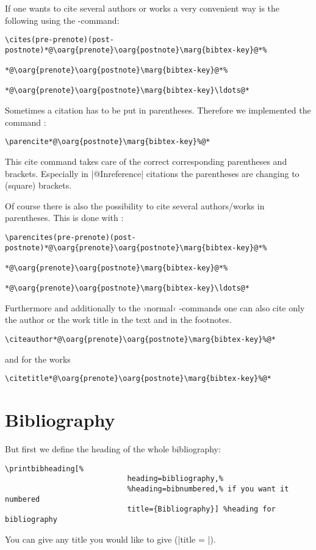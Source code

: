 \documentclass[a4paper,
10pt,
english
]{ltxdoc}
\begin{document}
\DescribeMacro{\cites}
If one wants to cite several authors or works a very convenient way is the following using the -command:
\begin{lstlisting}
\cites(pre-prenote)(post-postnote)*@\oarg{prenote}\oarg{postnote}\marg{bibtex-key}@*%
 																	*@\oarg{prenote}\oarg{postnote}\marg{bibtex-key}@*%
 																	*@\oarg{prenote}\oarg{postnote}\marg{bibtex-key}\ldots@*
\end{lstlisting}
 
\DescribeMacro{\parencite}
Sometimes a citation has to be put in parentheses. 
Therefore we implemented the command :
\begin{lstlisting}
\parencite*@\oarg{postnote}\marg{bibtex-key}%@*
\end{lstlisting} 
This cite command takes care of the correct corresponding parentheses and brackets.
Especially in |@Inreference| citations the parentheses are changing to (square) brackets.


\DescribeMacro{\parencites}
Of course there is also the possibility to cite several authors/works in parentheses.
This is done with :
\begin{lstlisting}
\parencites(pre-prenote)(post-postnote)*@\oarg{prenote}\oarg{postnote}\marg{bibtex-key}@*%
 																			*@\oarg{prenote}\oarg{postnote}\marg{bibtex-key}@*%
 																			*@\oarg{prenote}\oarg{postnote}\marg{bibtex-key}\ldots@*
\end{lstlisting}
 

\DescribeMacro{\citeauthor}\DescribeMacro{\citetitle}\label{citeauthor}%
Furthermore and additionally to the ›normal‹ -commands one can also cite only the author or the work title in the text and in the footnotes.
\begin{lstlisting}
\citeauthor*@\oarg{prenote}\oarg{postnote}\marg{bibtex-key}%@*
\end{lstlisting} 
  and for the works 
\begin{lstlisting}
\citetitle*@\oarg{prenote}\oarg{postnote}\marg{bibtex-key}%@*
\end{lstlisting} 


 \section{Bibliography}\label{bibliographie}
 \DescribeMacro{\printbibliography}
But first we define the heading of the whole  bibliography:
\begin{lstlisting}
\printbibheading[%
							heading=bibliography,%
							%heading=bibnumbered,% if you want it numbered
							title={Bibliography}] %heading for bibliography
\end{lstlisting}
You can give any title you would like to give (|title = |).
\end{document}
